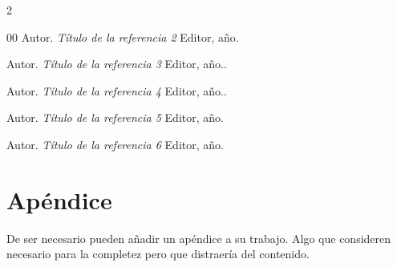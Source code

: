 \documentclass[10pt]{article}
\begin{document}
\begin{multicols}{2}
\begin{thebibliography}{00}
	        \newblock Autor.
	        \newblock \textit{Título de la referencia 2}
	        \newblock Editor, año.
	        
	        \newblock Autor.
	        \newblock \textit{Título de la referencia 3}
	        \newblock Editor, año..
	        
	        \newblock Autor.
	        \newblock \textit{Título de la referencia 4}
	        \newblock Editor, año..
	    
	        \newblock Autor.
	        \newblock \textit{Título de la referencia 5}
	        \newblock Editor, año.
	        
	        \newblock Autor.
	        \newblock \textit{Título de la referencia 6}
	        \newblock Editor, año.
	    
	    \end{thebibliography}
	\end{multicols}
	
	\newpage
	    \section*{Apéndice}
	    De ser necesario pueden añadir un apéndice a su trabajo. Algo que consideren necesario para la completez pero que distraería del contenido.
\end{document}
